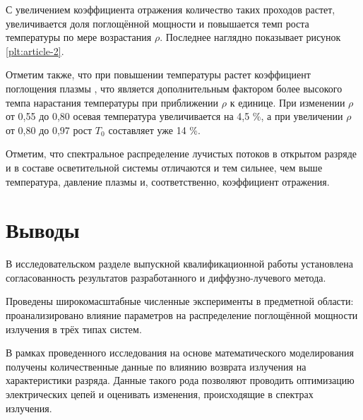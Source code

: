 С увеличением коэффициента отражения количество таких проходов растет, увеличивается доля поглощённой мощности и повышается темп роста температуры по мере возрастания $\rho$.
Последнее наглядно показывает рисунок \ref{plt:article-2}.

Отметим также, что при повышении температуры растет коэффициент поглощения плазмы \cite{article-8-gradov, article-9-gradov}, что является дополнительным фактором более высокого темпа нарастания температуры при приближении $\rho$ к единице.
При изменении $\rho$ от 0,55 до 0,80 осевая температура увеличивается на 4,5 \%, а при увеличении $\rho$ от 0,80 до 0,97 рост $T_0$ составляет уже 14 \%.

Отметим, что спектральное распределение лучистых потоков в открытом разряде и в составе осветительной системы отличаются и тем сильнее, чем выше температура, давление плазмы и, соответственно, коэффициент отражения.

\section*{Выводы}

В исследовательском разделе выпускной квалификационной работы установлена согласованность результатов разработанного и диффузно-лучевого метода.

Проведены широкомасштабные численные эксперименты в предметной области: проанализировано влияние параметров на распределение поглощённой мощности излучения в трёх типах систем.

В рамках проведенного исследования на основе математического моделирования получены количественные данные по влиянию возврата излучения на характеристики разряда.
Данные такого рода позволяют проводить оптимизацию электрических цепей и оценивать изменения, происходящие в спектрах излучения.
